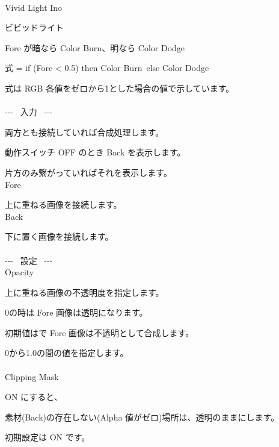 \documentclass[a4paper,12pt]{article}
\begin{document}
\thispagestyle{empty}

\Large
\noindent \\
Vivid Light Ino\medskip
\par
\normalsize
ビビッドライト\par
Fore が暗なら Color Burn、明なら Color Dodge\par
式 = if (Fore < 0.5) then \textquotedbl Color Burn\textquotedbl \ else \textquotedbl Color Dodge\textquotedbl\par
式は RGB 各値をゼロから1とした場合の値で示しています。\\
\\
-{-}- \ 入力 \ -{-}-\par
両方とも接続していれば合成処理します。\par
動作スイッチ OFF のとき Back を表示します。\par
片方のみ繋がっていればそれを表示します。\\
Fore\par
上に重ねる画像を接続します。\\
Back\par
下に置く画像を接続します。\\
\\
-{-}- \ 設定 \ -{-}-\\
Opacity\par
上に重ねる画像の不透明度を指定します。\par
0の時は Fore 画像は透明になります。\par
初期値は\textquotedbl で Fore 画像は不透明として合成します。\par
0から1.0の間の値を指定します。\\
\\
Clipping Mask\par
ON にすると、\par
素材(Back)の存在しない(Alpha 値がゼロ)場所は、透明のままにします。\par
初期設定は ON です。
\end{document}
